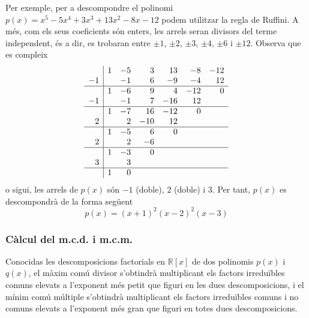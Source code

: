 Per exemple, per a descompondre el polinomi $p(x)=x^{5}-5x^{4}+3x^{3}+13x^{2}-8x-12$ podem utilitzar la regla de
Ruffini. A més, com els seus coeficients són enters, les arrels seran divisors del terme independent, és a dir, es trobaran entre $\pm 1$, $\pm 2$, $\pm 3$, $\pm 4$, $\pm 6$ i $\pm 12$. Observa que es compleix\begin{equation*}
\begin{array}{r|rrrrrr}
& 1 & -5 & 3 & 13 & -8 & -12 \\
-1 & & -1 & 6 & -9 & -4 & 12 \\ \hline
& 1 & -6 & 9 & 4 & -12 & 0 \\
-1 & & -1 & 7 & -16 & 12 & \\ \hline
& 1 & -7 & 16 & -12 & 0 & \\
2 & & 2 & -10 & 12 & & \\ \hline
& 1 & -5 & 6 & 0 & & \\
2 & & 2 & -6 & & & \\ \hline
& 1 & -3 & 0 & & & \\
3 & & 3 & & & & \\ \hline
& 1 & 0 & & & &
\end{array}\end{equation*}o sigui, les arrels de $p(x)$ són $-1$ (doble), $2$ (doble) i $3$. Per tant, $p(x)$ es descompondrà de la forma següent\begin{equation*}
p(x)=(x+1)^{2}(x-2)^{2}(x-3)
\end{equation*}

\subsubsection{Càlcul del m.c.d. i m.c.m.}

Conocidas les descomposicions factorials en $\mathbb{R}[x]$ de dos
polinomis $p(x)$ i $q(x)$, el màxim comú divisor s'obtindrà
multiplicant els factors irreduïbles comuns elevats a l'exponent més petit que figuri en les dues descomposicions, i el mínim comú múltiple s'obtindrà multiplicant els factors irreduïbles
comuns i no comuns elevats a l'exponent més gran que figuri en
totes dues descomposicions.

